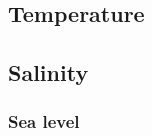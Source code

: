   
   
   

\subsection{Temperature}
\label{subsec:tempe}
   

\subsection{Salinity}
\label{subsec:salin}
   

\subsubsection{Sea level}
\label{subsec:seale}
   
\clearpage
